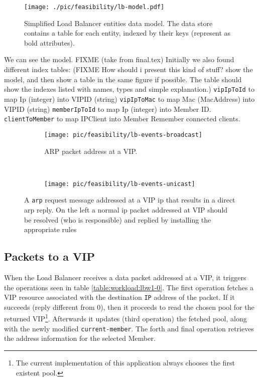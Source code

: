 \begin{figure}[H]
\centering 
\texttt{[image: ./pic/feasibility/lb-model.pdf]}
\caption{\small Simplified Load Balancer entities data model. The data
store contains a table for each entity, indexed by their keys (represent as bold attributes). }
\label{fig:lb-model}
\end{figure}

We can see the model. FIXME (take from final.tex) 
Initially we also found different index tables:  (FIXME How should i
present this kind of stuff? show the model, and then show a table in
the same figure if possible. The table should show the indexes listed
with names, types and simple explanation.) 
\texttt{vipIpToId} to map Ip (integer) into VIPID (string) 
\texttt{vipIpToMac} to map Mac (MacAddress) into VIPID (string) 
\texttt{memberIpToId} to map Ip (integer) into Member ID. 
\texttt{clientToMember} to map IPClient into Member  Remember
connected clients. 




\begin{figure}
  \centering
  \begin{subfigure}[b]{0.5\textwidth}
                \centering
                \texttt{[image: pic/feasibility/lb-events-broadcast]}
                \caption{ARP packet address at a VIP.}
                \label{fig:lb:interaction:arp2Vip}
        \end{subfigure}%
        ~
        \begin{subfigure}[b]{0.5\textwidth}
                \centering
                \texttt{[image: pic/feasibility/lb-events-unicast]}
                \caption{}
                \label{fig:lb:interaction:ip2Vip}
        \end{subfigure}
        \caption[Load Balancer workload events]{A \texttt{\gls{arp}} request message addressed at a VIP \gls{ip} that results in a direct \gls{arp} reply. On the left a normal \gls{ip} packet addressed at VIP should be resolved (who is responsible) and replied by installing the appropriate rules}  
        \label{fig:lb:interaction}
\end{figure}

\subsection{Packets to a VIP}
When the Load Balancer  receives a data packet addressed
at a VIP, it triggers the operations seen in table
\ref{table:workload:lbw1-0}. 
The first operation fetches a VIP resource associated with the
destination \texttt{IP} address of the packet.
If it succeeds (reply different from 0), then it proceeds to read 
the chosen pool for the returned  VIP\footnote{The current implementation of this
application always chooses the first existent pool.}.
Afterwards it updates (third operation) the fetched  pool, along with the newly modified
\texttt{current-member}.
The forth and final operation retrieves
the address information for the selected  Member. 

